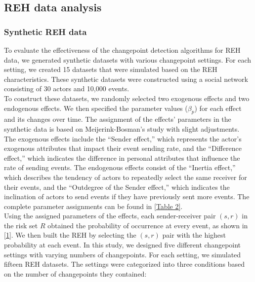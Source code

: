 \documentclass[]{interact}
\theoremstyle{plain}%
\theoremstyle{definition}
\theoremstyle{remark}
\begin{document}
    \subsection{REH data analysis} \label{sec:data}
   
	\subsubsection{Synthetic REH data} \label{sec:simulation}
	
	\hspace{0.2cm} To evaluate the effectiveness of the changepoint detection algorithms for REH data, we generated synthetic datasets with various changepoint settings. For each setting, we created 15 datasets that were simulated based on the REH characteristics. These synthetic datasets were constructed using a social network consisting of 30 actors and 10,000 events.\\
	
	To construct these datasets, we randomly selected two exogenous effects and two endogenous effects. We then specified the parameter values ($\beta_p$) for each effect and its changes over time. The assignment of the effects' parameters in the synthetic data is based on Meijerink-Bosman's study \cite{meijerink-bosmanDiscoveringTrendsSocial2022} with slight adjustments. The exogenous effects include the ``Sender effect,'' which represents the actor's exogenous attributes that impact their event sending rate, and the ``Difference effect,'' which indicates the difference in personal attributes that influence the rate of sending events. The endogenous effects consist of the ``Inertia effect,'' which describes the tendency of actors to repeatedly select the same receiver for their events, and the ``Outdegree of the Sender effect,'' which indicates the inclination of actors to send events if they have previously sent more events. The complete parameter assignments can be found in \autoref{Table 2}. \\
	
	Using the assigned parameters of the effects, each sender-receiver pair $(s,r)$ in the risk set $R$ obtained the probability of occurrence at every event, as shown in \autoref{1}. We then built the REH by selecting the $(s,r)$ pair with the highest probability at each event. In this study, we designed five different changepoint settings with varying numbers of changepoints. For each setting, we simulated fifteen REH datasets. The settings were categorized into three conditions based on the number of changepoints they contained:
	
\end{document}
